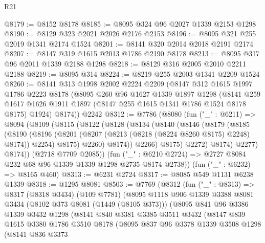 \begin{lexlean}{R21}
\begin{coremodule}
@8179 := @8152 @8178
@8185 := @8095 @324 @96 @2027 @1339 @2153 @1298
@8190 := @8129 @323 @2021 @2026 @2176 @2153
@8196 := @8095 @321 @255 @2019 @1341 @2174 @1524
@8201 := @8141 @320 @2014 @2018 @2191 @2174
@8207 := @8147 @319 @1615 @2013 @1786 @2190 @8178
@8213 := @8095 @317 @96 @2011 @1339 @2188 @1298
@8218 := @8129 @316 @2005 @2010 @2211 @2188
@8219 := @8095 @314
@8224 := @8219 @255 @2003 @1341 @2209 @1524
@8260 := @8141
    @313
    @1998
    @2002
    @2224
    @2209
    (@8147
      @312
      @1615
      @1997
      @1786
      @2223
      @8178
      (@8095
        @260
        @96
        @1627
        @1339
        @1897
        @1298
        (@8141 @259 @1617 @1626 @1911 @1897 (@8147 @255 @1615 @1341 @1786 @1524 @8178 @8175) @1924)
        @8174))
    @2242
@8312 := @7786
    (@8080
      (fun ("_" : @6211) =>
      @8094
        (@8109
          (@8115
            (@8122
              (@8128
                (@8134
                  (@8140
                    (@8146
                      (@8179
                        (@8185
                          (@8190
                            (@8196
                              (@8201 (@8207 (@8213 (@8218 (@8224 @8260 @8175) @2248) @8174)) @2254)
                              @8175)
                            @2260)
                          @8174))
                      @2266)
                    @8175)
                  @2272)
                @8174)
              @2277)
            @8174))
        (@2718 @7709 @2085))
      (fun ("_" : @6210 @2724) => @2727 @8084 @232 @68 @96 @1339 @1339 @1298 @2735 @8174 @2738))
    (fun ("_" : @6232) => @8165 @460)
@8313 := @6231 @2724
@8317 := @8085 @549 @1131 @6238 @1339
@8318 := @1295 @8081
@8503 := @7769
    (@8312
      (fun ("_" : @8313) =>
      @8317
        (@8318 @3434)
        (@109 @7781)
        (@8095
          @1118
          @906
          @1339
          @3388
          @8081
          @3434
          (@8102 @373 @8081 (@1449 (@8105 @373)))
          (@8095
            @841
            @96
            @3386
            @1339
            @3432
            @1298
            (@8141
              @840
              @3381
              @3385
              @3511
              @3432
              (@8147
                @839
                @1615
                @3380
                @1786
                @3510
                @8178
                (@8095
                  @837
                  @96
                  @3378
                  @1339
                  @3508
                  @1298
                  (@8141
                    @836
                    @3373

\end{coremodule}
\end{lexlean}
